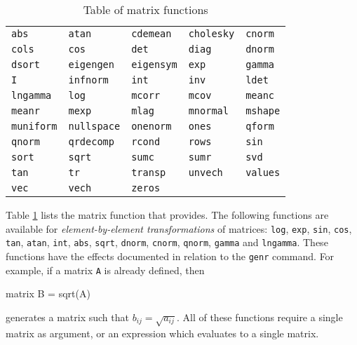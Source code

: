 \begin{table}[htbp]
\centering
\begin{tabular}{lllll}
\texttt{abs}       &
\texttt{atan}      &
\texttt{cdemean}   &
\texttt{cholesky}  &
\texttt{cnorm}     \\
\texttt{cols}      &
\texttt{cos}       &
\texttt{det}       &
\texttt{diag}      &
\texttt{dnorm}     \\
\texttt{dsort}     &
\texttt{eigengen}  &
\texttt{eigensym}  &
\texttt{exp}       &
\texttt{gamma}     \\
\texttt{I}         &
\texttt{infnorm}   &
\texttt{int}       &
\texttt{inv}       &
\texttt{ldet}      \\
\texttt{lngamma}   &
\texttt{log}       &
\texttt{mcorr}     &
\texttt{mcov}      &
\texttt{meanc}     \\
\texttt{meanr}     &
\texttt{mexp}      &
\texttt{mlag}      &
\texttt{mnormal}   &
\texttt{mshape}    \\
\texttt{muniform}  &
\texttt{nullspace} &
\texttt{onenorm}   &
\texttt{ones}      &
\texttt{qform}     \\
\texttt{qnorm}     &
\texttt{qrdecomp}  &
\texttt{rcond}     &
\texttt{rows}      &
\texttt{sin}       \\
\texttt{sort}      &
\texttt{sqrt}      &
\texttt{sumc}      &
\texttt{sumr}      &
\texttt{svd}       \\
\texttt{tan}       &
\texttt{tr}        &
\texttt{transp}    &
\texttt{unvech}    &
\texttt{values}    \\
\texttt{vec}       &
\texttt{vech}      &
\texttt{zeros}     
\end{tabular}      
\caption{Table of matrix functions}
\label{tab:matrix_funcs}
\end{table}

Table \ref{tab:matrix_funcs} lists the matrix function that
 provides. The following functions are available for
\textit{element-by-element transformations} of matrices: \texttt{log},
\texttt{exp}, \texttt{sin}, \texttt{cos}, \texttt{tan}, \texttt{atan},
\texttt{int}, \texttt{abs}, \texttt{sqrt}, \texttt{dnorm},
\texttt{cnorm}, \texttt{qnorm}, \texttt{gamma} and \texttt{lngamma}.
These functions have the effects documented in relation to the
\texttt{genr} command.  For example, if a matrix \texttt{A} is already
defined, then
%
\begin{code}
matrix B = sqrt(A)
\end{code}
%
generates a matrix such that $b_{ij} = \sqrt{a_{ij}}$.  All of these
functions require a single matrix as argument, or an expression which
evaluates to a single matrix.

